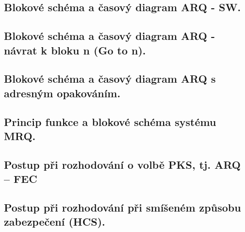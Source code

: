 \subsection{Blokové schéma a časový diagram ARQ - SW.}
\subsection{Blokové schéma a časový diagram ARQ - návrat k bloku n (Go to n).}
\subsection{Blokové schéma a časový diagram ARQ s adresným opakováním.}
\subsection{Princip funkce a blokové schéma systému MRQ.}
\subsection{Postup při rozhodování o volbě PKS, tj. ARQ – FEC}
\subsection{Postup při rozhodování při smíšeném způsobu zabezpečení (HCS).}
